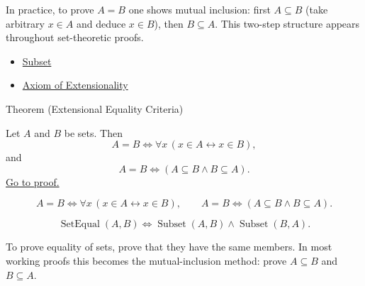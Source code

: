 \begin{remark*}[Exposition]
In practice, to prove $A = B$ one shows mutual inclusion: first $A \subseteq B$
(take arbitrary $x \in A$ and deduce $x \in B$), then $B \subseteq A$.
This two-step structure appears throughout set-theoretic proofs.
\end{remark*}

\begin{dependencies}
\begin{itemize}
  \item \hyperref[def:subset]{Subset}
  \item \hyperref[ax:extensionality]{Axiom of Extensionality}
\end{itemize}
\end{dependencies}

\begin{theorembox}{Theorem (Extensional Equality Criteria)}
\begin{theorem}\label{thm:extensional-equality-criteria}
Let $A$ and $B$ be sets. Then
\[
A=B \iff \forall x\,(x\in A\leftrightarrow x\in B),
\]
and
\[
A=B \iff (A\subseteq B \land B\subseteq A).
\]
\hyperref[prf:extensional-equality-criteria]{Go to proof.}
\end{theorem}
\end{theorembox}

\begin{remark*}
\[
  A=B \iff \forall x\,(x\in A\leftrightarrow x\in B),
  \qquad
  A=B \iff (A\subseteq B \wedge B\subseteq A).
\]
\end{remark*}

\begin{remark*}
\[
  \operatorname{SetEqual}(A,B)
  \iff
  \operatorname{Subset}(A,B)\wedge\operatorname{Subset}(B,A).
\]
\end{remark*}

\begin{remark*}[Interpretation]
To prove equality of sets, prove that they have the same members. In most
working proofs this becomes the mutual-inclusion method: prove $A\subseteq B$
and $B\subseteq A$.
\end{remark*}


